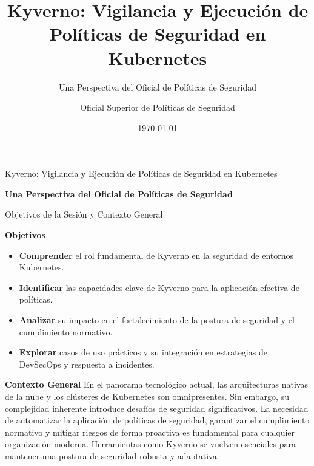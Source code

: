 \documentclass[aspectratio=169]{beamer}
\title[Kyverno: Vigilancia y Ejecució]{Kyverno: Vigilancia y Ejecución de Políticas de Seguridad en Kubernetes}
\subtitle{Una Perspectiva del Oficial de Políticas de Seguridad}
\author{Oficial Superior de Políticas de Seguridad}
\institute{Academia de Ciberseguridad / Cuerpo de Seguridad del Estado}
\date{\today}
\begin{document}
\begin{frame}
  \titlepage
\end{frame}

\usebackgroundtemplate{}


\begin{frame}{Kyverno: Vigilancia y Ejecución de Políticas de Seguridad en Kubernetes}

\textbf{Una Perspectiva del Oficial de Políticas de Seguridad}

\end{frame}

\begin{frame}{Objetivos de la Sesión y Contexto General}


\textbf{Objetivos}
\begin{itemize}
  \item \textbf{Comprender} el rol fundamental de Kyverno en la seguridad de entornos Kubernetes.
  \item \textbf{Identificar} las capacidades clave de Kyverno para la aplicación efectiva de políticas.
  \item \textbf{Analizar} su impacto en el fortalecimiento de la postura de seguridad y el cumplimiento normativo.
  \item \textbf{Explorar} casos de uso prácticos y su integración en estrategias de DevSecOps y respuesta a incidentes.
\end{itemize}
\textbf{Contexto General}
En el panorama tecnológico actual, las arquitecturas nativas de la nube y los clústeres de Kubernetes son omnipresentes. Sin embargo, su complejidad inherente introduce desafíos de seguridad significativos. La necesidad de automatizar la aplicación de políticas de seguridad, garantizar el cumplimiento normativo y mitigar riesgos de forma proactiva es fundamental para cualquier organización moderna. Herramientas como Kyverno se vuelven esenciales para mantener una postura de seguridad robusta y adaptativa.

\end{frame}
\end{document}
